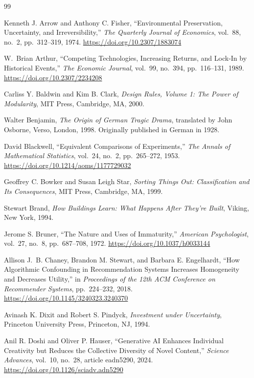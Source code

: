 \begin{thebibliography}{99}

Kenneth J. Arrow and Anthony C. Fisher,
``Environmental Preservation, Uncertainty, and Irreversibility,''
\textit{The Quarterly Journal of Economics},
vol.~88, no.~2, pp.~312--319, 1974.
\url{https://doi.org/10.2307/1883074}

W.~Brian Arthur,
``Competing Technologies, Increasing Returns, and Lock-In by
Historical Events,''
\textit{The Economic Journal},
vol.~99, no.~394, pp.~116--131, 1989.
\url{https://doi.org/10.2307/2234208}

Carliss Y. Baldwin and Kim B. Clark,
\textit{Design Rules, Volume 1: The Power of Modularity},
MIT Press, Cambridge, MA, 2000.

Walter Benjamin,
\textit{The Origin of German Tragic Drama},
translated by John Osborne,
Verso, London, 1998.
Originally published in German in 1928.

David Blackwell,
``Equivalent Comparisons of Experiments,''
\textit{The Annals of Mathematical Statistics},
vol.~24, no.~2, pp.~265--272, 1953.
\url{https://doi.org/10.1214/aoms/1177729032}

Geoffrey C. Bowker and Susan Leigh Star,
\textit{Sorting Things Out: Classification and Its Consequences},
MIT Press, Cambridge, MA, 1999.

Stewart Brand,
\textit{How Buildings Learn: What Happens After They're Built},
Viking, New York, 1994.

Jerome S. Bruner,
``The Nature and Uses of Immaturity,''
\textit{American Psychologist},
vol.~27, no.~8, pp.~687--708, 1972.
\url{https://doi.org/10.1037/h0033144}

Allison J.~B. Chaney, Brandon M. Stewart, and Barbara E. Engelhardt,
``How Algorithmic Confounding in Recommendation Systems Increases
Homogeneity and Decreases Utility,''
in \textit{Proceedings of the 12th ACM Conference on Recommender Systems},
pp.~224--232, 2018.
\url{https://doi.org/10.1145/3240323.3240370}

Avinash K. Dixit and Robert S. Pindyck,
\textit{Investment under Uncertainty},
Princeton University Press, Princeton, NJ, 1994.

Anil R. Doshi and Oliver P. Hauser,
``Generative AI Enhances Individual Creativity but Reduces the
Collective Diversity of Novel Content,''
\textit{Science Advances},
vol.~10, no.~28, article eadn5290, 2024.
\url{https://doi.org/10.1126/sciadv.adn5290}


\end{thebibliography}
